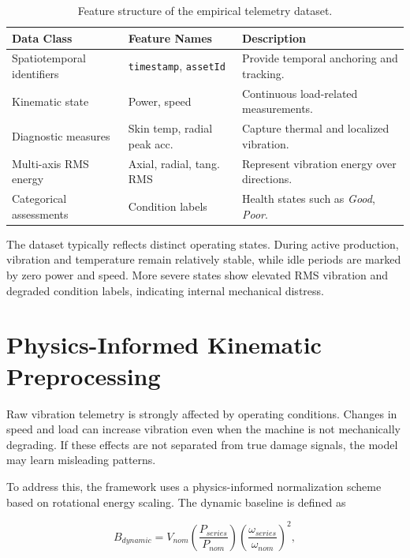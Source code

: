 \documentclass[journal,10pt,a4paper]{IEEEtran}
\begin{document}
\begin{table}[H]
\centering
\caption{Feature structure of the empirical telemetry dataset.}
\label{tab:feature-structure}
\begin{tabularx}{\columnwidth}{L{2cm} L{2cm} Y}
\toprule
\textbf{Data Class} & \textbf{Feature Names} & \textbf{Description} \\
\midrule
Spatiotemporal identifiers & \texttt{timestamp}, \texttt{assetId} & Provide temporal anchoring and tracking. \\
\addlinespace
Kinematic state & Power, speed & Continuous load-related measurements. \\
\addlinespace
Diagnostic measures & Skin temp, radial peak acc. & Capture thermal and localized vibration. \\
\addlinespace
Multi-axis RMS energy & Axial, radial, tang. RMS & Represent vibration energy over directions. \\
\addlinespace
Categorical assessments & Condition labels & Health states such as \emph{Good}, \emph{Poor}. \\
\bottomrule
\end{tabularx}
\end{table}

The dataset typically reflects distinct operating states. During active production, vibration and temperature remain relatively stable, while idle periods are marked by zero power and speed. More severe states show elevated RMS vibration and degraded condition labels, indicating internal mechanical distress.

\section{Physics-Informed Kinematic Preprocessing}
Raw vibration telemetry is strongly affected by operating conditions. Changes in speed and load can increase vibration even when the machine is not mechanically degrading. If these effects are not separated from true damage signals, the model may learn misleading patterns.

To address this, the framework uses a physics-informed normalization scheme based on rotational energy scaling. The dynamic baseline is defined as

\begin{equation}
B_{dynamic} = V_{nom} \left( \frac{P_{series}}{P_{nom}} \right) \left( \frac{\omega_{series}}{\omega_{nom}} \right)^2,
\end{equation}
\end{document}
